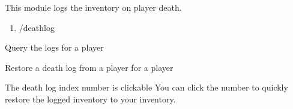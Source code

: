
This module logs the inventory on player death.

\begin{enumerate}
    \item /deathlog
\end{enumerate}


\begin{example}{Query the logs for a player}
\end{example}

\begin{example}{Restore a death log from a player for a player}
\end{example}

\begin{tips}{The death log index number is clickable}
    You can click the number to quickly restore the logged inventory to your inventory.
\end{tips}